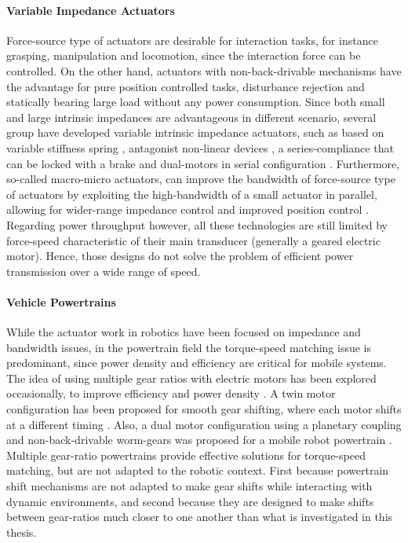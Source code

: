 \paragraph{Variable Impedance Actuators} Force-source type of actuators are desirable for interaction tasks, for instance grasping, manipulation and locomotion, since the interaction force can be controlled. On the other hand, actuators with non-back-drivable mechanisms have the advantage for pure position controlled tasks, disturbance rejection and statically bearing large load without any power consumption. Since both small and large intrinsic impedances are advantageous in different scenario, several group have developed variable intrinsic impedance actuators, such as based on variable stiffness spring \cite{tonietti_design_2005}, antagonist non-linear devices \cite{koganezawa_antagonistic_2006}, a series-compliance that can be locked with a brake \cite{leach_linear_2012} and dual-motors in serial configuration \cite{kim_serial-type_2010}. Furthermore, so-called macro-micro actuators, can improve the bandwidth of force-source type of actuators by exploiting the high-bandwidth of a small actuator in parallel, allowing for wider-range impedance control and improved position control \cite{morrell_parallel-coupled_1998}. Regarding power throughput however, all these technologies are still limited by force-speed characteristic of their main transducer (generally a geared electric motor). Hence, those designs do not solve the problem of efficient power transmission over a wide range of speed.

\paragraph{Vehicle Powertrains} While the actuator work in robotics have been focused on impedance and bandwidth issues, in the powertrain field the torque-speed matching issue is predominant, since power density and efficiency are critical for mobile systems. The idea of using multiple gear ratios with electric motors has been explored occasionally, to improve efficiency and power density \cite{mckeegan_antonovs_2011}. A twin motor configuration has been proposed for smooth gear shifting, where each motor shifts at a different timing \cite{bologna_electric_2014}. Also, a dual motor configuration using a planetary coupling and non-back-drivable worm-gears was proposed for a mobile robot powertrain \cite{lee_new_2012}. Multiple gear-ratio powertrains provide effective solutions for torque-speed matching, but are not adapted to the robotic context. First because powertrain shift mechanisms are not adapted to make gear shifts while interacting with dynamic environments, and second because they are designed to make shifts between gear-ratios much closer to one another than what is investigated in this thesis.

